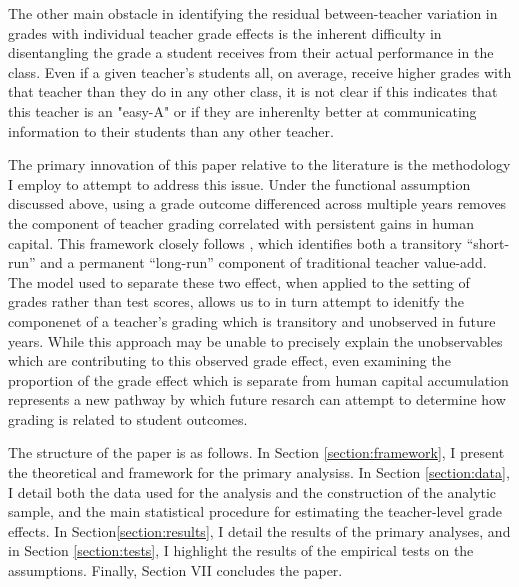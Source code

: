 \documentclass[../thesis_main.tex]{subfiles}
\begin{document}
The other main obstacle in identifying the residual between-teacher variation in grades with individual teacher grade effects is the inherent difficulty in disentangling the grade a student receives from their actual performance in the class. Even if a given teacher's students all, on average, receive higher grades with that teacher than they do in any other class, it is not clear if this indicates that this teacher is an "easy-A" or if they are inherenlty better at communicating information to their students than any other teacher.

The primary innovation of this paper relative to the literature is the methodology I employ to attempt to address this issue. Under the functional assumption discussed above, using a grade outcome differenced across multiple years removes the component of teacher grading correlated with persistent gains in human capital. This framework closely follows \citet{gilraineMakingTeachingLast2020}, which identifies both a transitory ``short-run'' and a permanent ``long-run'' component of traditional teacher value-add. The model used to separate these two effect, when applied to the setting of grades rather than test scores, allows us to in turn attempt to idenitfy the componenet of a teacher's grading which is transitory and unobserved in future years. While this approach may be unable to precisely explain the unobservables which are contributing to this observed grade effect, even examining the proportion of the grade effect which is separate from human capital accumulation represents a new pathway by which future resarch can attempt to determine how grading is related to student outcomes. 


The structure of the paper is as follows. In Section \ref{section:framework}, I present the theoretical and framework for the primary analysiss. In Section \ref{section:data}, I detail both the data used for the analysis and the construction of the analytic sample, and the main statistical procedure for estimating the teacher-level grade effects. In Section\ref{section:results}, I detail the results of the primary analyses, and in Section \ref{section:tests}, I highlight the results of the empirical tests on the assumptions. Finally, Section VII concludes the paper. 
\end{document}
